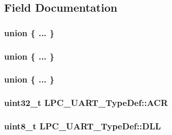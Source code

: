 \subsection{Field Documentation}
\subsubsection[{\texorpdfstring{"@34}{@34}}]{\setlength{\rightskip}{0pt plus 5cm}union \{ ... \} }\hypertarget{structLPC__UART__TypeDef_addac49f5ad5d32565982299ef7a05255}{}\label{structLPC__UART__TypeDef_addac49f5ad5d32565982299ef7a05255}
\subsubsection[{\texorpdfstring{"@36}{@36}}]{\setlength{\rightskip}{0pt plus 5cm}union \{ ... \} }\hypertarget{structLPC__UART__TypeDef_ad7614b8d6f7ee964067c7aa168c4358f}{}\label{structLPC__UART__TypeDef_ad7614b8d6f7ee964067c7aa168c4358f}
\subsubsection[{\texorpdfstring{"@38}{@38}}]{\setlength{\rightskip}{0pt plus 5cm}union \{ ... \} }\hypertarget{structLPC__UART__TypeDef_ad3c3c6c2fdc7fdd59bdd946647794c8e}{}\label{structLPC__UART__TypeDef_ad3c3c6c2fdc7fdd59bdd946647794c8e}
\subsubsection[{\texorpdfstring{A\+CR}{ACR}}]{ uint32\+\_\+t L\+P\+C\+\_\+\+U\+A\+R\+T\+\_\+\+Type\+Def\+::\+A\+CR}\hypertarget{structLPC__UART__TypeDef_a7d5c974d92ad63ce7f5e212a7b4bfcd0}{}\label{structLPC__UART__TypeDef_a7d5c974d92ad63ce7f5e212a7b4bfcd0}
\subsubsection[{\texorpdfstring{D\+LL}{DLL}}]{ uint8\+\_\+t L\+P\+C\+\_\+\+U\+A\+R\+T\+\_\+\+Type\+Def\+::\+D\+LL}\hypertarget{structLPC__UART__TypeDef_a49326fc2883951237f3c06ea41f5f3bf}{}\label{structLPC__UART__TypeDef_a49326fc2883951237f3c06ea41f5f3bf}
